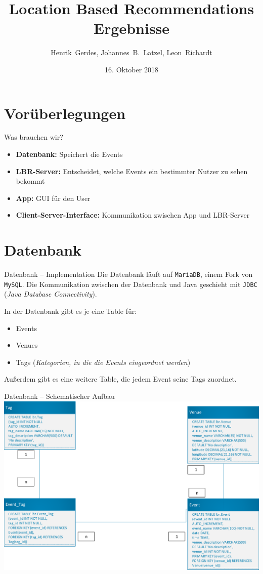\documentclass{beamer}
\title{Location Based Recommendations\\Ergebnisse}
\author[H.~Gerdes, J.B.~Latzel, L.~Richardt]{Henrik~Gerdes, Johannes~B.~Latzel, Leon~Richardt}
\institute{Universität Osnabrück}
\date[16.10.2018]{16. Oktober 2018}
\begin{document}
	
	\begin{frame}
		\titlepage
	\end{frame}

	\section{Vorüberlegungen}
	\begin{frame}{Was brauchen wir?}
			\begin{itemize}
				\item \textbf{Datenbank:} Speichert die Events
				\item \textbf{LBR-Server:} Entscheidet, welche Events ein bestimmter Nutzer zu sehen bekommt
				\item \textbf{App:} GUI für den User
				\item \textbf{Client-Server-Interface:} Kommunikation zwischen App und LBR-Server
			\end{itemize}
	\end{frame}

	\section{Datenbank}
	\begin{frame}{Datenbank -- Implementation}
		Die Datenbank läuft auf \alert{\texttt{MariaDB}}, einem Fork von \texttt{MySQL}. Die Kommunikation zwischen der Datenbank und Java geschieht mit \alert{\texttt{JDBC}} (\textit{Java Database Connectivity}).
		
		\pause
		In der Datenbank gibt es je eine Table für:
		\begin{itemize}
			\item Events
			\item Venues
			\item Tags (\textit{Kategorien, in die die Events eingeordnet werden})
		\end{itemize}
		Außerdem gibt es eine weitere Table, die jedem Event seine Tags zuordnet.
		
	\end{frame}

	\begin{frame}{Datenbank -- Schematischer Aufbau}
		\centering\includegraphics[scale=0.5]{db_scheme}
	\end{frame}
\end{document}
